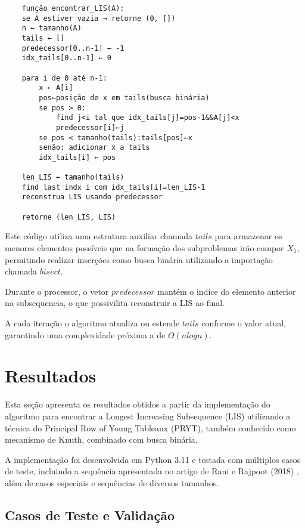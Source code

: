 \documentclass[por]{ajceam-class}
\begin{document}
\begin{verbatim}
    função encontrar_LIS(A):
    se A estiver vazia → retorne (0, [])
    n ← tamanho(A)
    tails ← []
    predecessor[0..n-1] ← -1
    idx_tails[0..n-1] ← 0

    para i de 0 até n-1:
        x ← A[i]
        pos←posição de x em tails(busca binária)
        se pos > 0:
            find j<i tal que idx_tails[j]=pos-1&&A[j]<x
            predecessor[i]←j
        se pos < tamanho(tails):tails[pos]←x
        senão: adicionar x a tails
        idx_tails[i] ← pos

    len_LIS ← tamanho(tails)
    find last indx i com idx_tails[i]=len_LIS-1
    reconstrua LIS usando predecessor

    retorne (len_LIS, LIS)

\end{verbatim} 
Este código utiliza uma estrutura auxiliar chamada $tails$ para armazenar os menores elementos possíveis que na formação dos subproblemas irão compor $X_1$, permitindo realizar inserções como busca binária utilizando a importação chamada $bisect$.

Durante o processor, o vetor $predecessor$ mantém o indice do elemento anterior na subsequencia, o que possivilita reconstruir a LIS ao final. 

A cada iteração o algoritmo atualiza ou estende $tails$ conforme o valor atual, garantindo uma complexidade próxima a de $O(n log n)$.


\section{Resultados}
\label{sec:resultados}

Esta seção apresenta os resultados obtidos a partir da implementação do algoritmo para encontrar a Longest Increasing Subsequence (LIS) utilizando a técnica do Principal Row of Young Tableaux (PRYT), também conhecido como mecanismo de Knuth, combinado com busca binária.

A implementação foi desenvolvida em Python 3.11 e testada com múltiplos casos de teste, incluindo a sequência apresentada no artigo de Rani e Rajpoot (2018) \cite{Rani2018}, além de casos especiais e sequências de diversos tamanhos.

\subsection{Casos de Teste e Validação}
\end{document}
